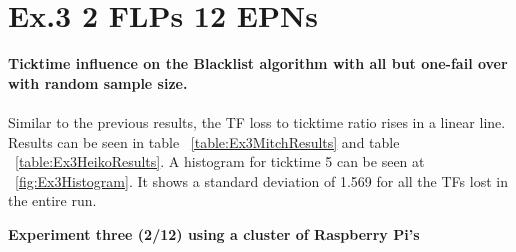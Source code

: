 \newpage

\section{Ex.3 2 FLPs 12 EPNs}
\textbf{Ticktime influence on the Blacklist algorithm with all but one-fail over with random sample size.}
\\~\\
Similar to the previous results, the TF loss to ticktime ratio rises in a linear line. Results can be seen in table ~\ref{table:Ex3MitchResults} and table ~\ref{table:Ex3HeikoResults}. A histogram for ticktime 5 can be seen at ~\ref{fig:Ex3Histogram}. It shows a standard deviation of 1.569 for all the TFs lost in the entire run. 

\begin{table}[h!]
\caption*{\textbf{Experiment three (2/12) using a cluster of Raspberry Pi's}}
\caption{Cumulative lost TFs by ticktime/EPN ratio with a random sample size for the Blacklist algorithm}
\label{table:Ex3MitchResults}
\end{table}

